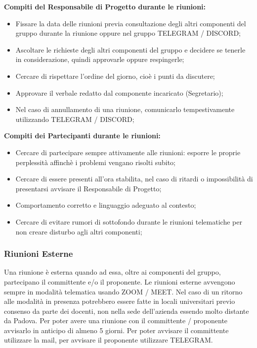 \textbf{Compiti del Responsabile di Progetto durante le riunioni:}
\begin{itemize}
\item{Fissare la data delle riunioni previa consultazione degli altri componenti del gruppo durante la riunione oppure nel gruppo TELEGRAM / DISCORD;}
\item{Ascoltare le richieste degli altri componenti del gruppo e decidere se tenerle in considerazione, quindi approvarle oppure respingerle;}
\item{Cercare di rispettare l'ordine del giorno, cioè i punti da discutere;}
\item{Approvare il verbale redatto dal componente incaricato (Segretario);}
\item{Nel caso di annullamento di una riunione, comunicarlo tempestivamente utilizzando TELEGRAM / DISCORD;}
\end{itemize}
\textbf{Compiti dei Partecipanti durante le riunioni:}
\begin{itemize}
\item{Cercare di partecipare sempre attivamente alle riunioni: esporre le proprie perplessità affinchè i problemi vengano risolti subito;}
\item{Cercare di essere presenti all'ora stabilita, nel caso di ritardi o impossibilità di presentarsi avvisare il Responsabile di Progetto;}
\item{Comportamento corretto e linguaggio adeguato al contesto;}
\item{Cercare di evitare rumori di sottofondo durante le riunioni telematiche per non creare disturbo agli altri componenti;}
\end{itemize}

\subsubsection{Riunioni Esterne}
Una riunione è esterna quando ad essa, oltre ai componenti del gruppo, partecipano il committente e/o il proponente.
Le riunioni esterne avvengono sempre in modalità telematica usando ZOOM / MEET. 
Nel caso di un ritorno alle modalità in presenza potrebbero essere fatte in locali universitari previo consenso da parte dei docenti, non nella sede dell'azienda essendo molto distante da Padova.
Per poter avere una riunione con il committente / proponente avvisarlo in anticipo di almeno 5 giorni.
Per poter avvisare il committente utilizzare la mail, per avvisare il proponente utilizzare TELEGRAM.

